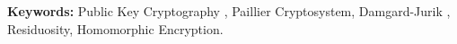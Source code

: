 {\bf Keywords:} Public Key Cryptography     , Paillier Cryptosystem, Damgard-Jurik           , Residuosity, Homomorphic Encryption.
%

